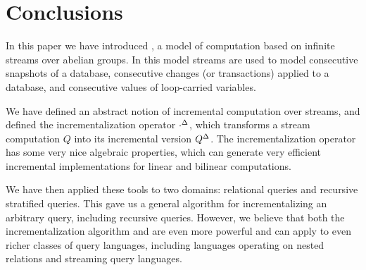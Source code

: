 \section{Conclusions}\label{sec:conclusions}%

In this paper we have introduced \dbsp, a model of computation based on 
infinite streams over abelian groups.  In this model streams are used 
to model consecutive snapshots of a database, consecutive changes (or transactions)
applied to a database, and consecutive values of loop-carried variables.

We have defined an abstract notion of incremental computation over streams, 
and defined the incrementalization operator
${\cdot}^{\Delta}$, which transforms a stream computation $Q$ into its incremental version ${Q}^{\Delta}$.
The incrementalization operator has some very nice algebraic properties, which
can generate very efficient incremental implementations for linear and bilinear
computations.

We have then applied these tools to two domains: relational queries and recursive 
stratified queries.  This gave us a general algorithm for incrementalizing an arbitrary
query, including recursive queries.
However, we believe that both the incrementalization algorithm and \dbsp are even more
powerful and can apply to even richer classes of query languages, including 
languages operating on nested relations and streaming query languages.
